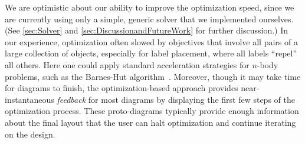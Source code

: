 We are optimistic about our ability to improve the optimization speed, since we are currently using only a simple, generic solver that we implemented ourselves. (See \cref{sec:Solver} and \cref{sec:DiscussionandFutureWork} for further discussion.) In our experience, optimization often slowed by objectives that involve all pairs of a large collection of objects, especially for label placement, where all labels ``repel'' all others.  Here one could apply standard acceleration strategies for \(n\)-body problems, such as the Barnes-Hut algorithm~\cite{Barnes:1986:barneshut}.  Moreover, though it may take time for diagrams to finish, the optimization-based approach provides near-instantaneous \emph{feedback} for most diagrams by displaying the first few steps of the optimization process.  These proto-diagrams typically provide enough information about the final layout that the user can halt optimization and continue iterating on the design.








